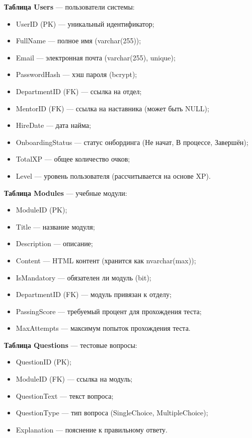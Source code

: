 \textbf{Таблица Users} --- пользователи системы:
\begin{itemize}
    \item UserID (PK) --- уникальный идентификатор;
    \item FullName --- полное имя (varchar(255));
    \item Email --- электронная почта (varchar(255), unique);
    \item PasswordHash --- хэш пароля (bcrypt);
    \item DepartmentID (FK) --- ссылка на отдел;
    \item MentorID (FK) --- ссылка на наставника (может быть NULL);
    \item HireDate --- дата найма;
    \item OnboardingStatus --- статус онбординга (Не начат, В процессе, Завершён);
    \item TotalXP --- общее количество очков;
    \item Level --- уровень пользователя (рассчитывается на основе XP).
\end{itemize}

\textbf{Таблица Modules} --- учебные модули:
\begin{itemize}
    \item ModuleID (PK);
    \item Title --- название модуля;
    \item Description --- описание;
    \item Content --- HTML контент (хранится как nvarchar(max));
    \item IsMandatory --- обязателен ли модуль (bit);
    \item DepartmentID (FK) --- модуль привязан к отделу;
    \item PassingScore --- требуемый процент для прохождения теста;
    \item MaxAttempts --- максимум попыток прохождения теста.
\end{itemize}

\textbf{Таблица Questions} --- тестовые вопросы:
\begin{itemize}
    \item QuestionID (PK);
    \item ModuleID (FK) --- ссылка на модуль;
    \item QuestionText --- текст вопроса;
    \item QuestionType --- тип вопроса (SingleChoice, MultipleChoice);
    \item Explanation --- пояснение к правильному ответу.
\end{itemize}

